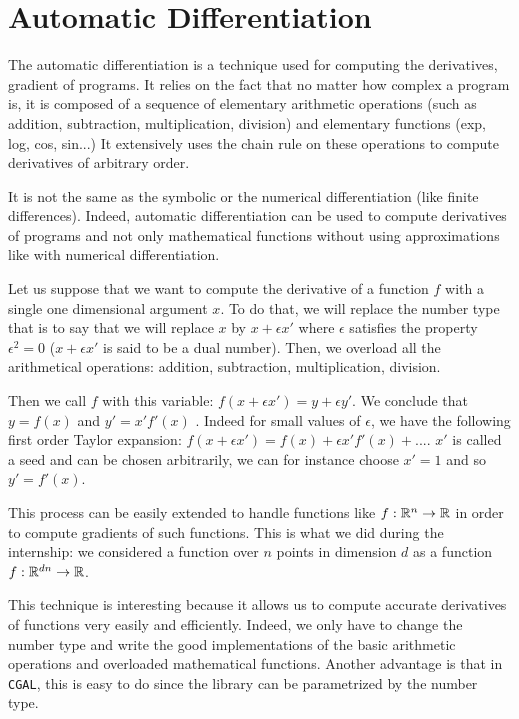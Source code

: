 \chapter{Automatic Differentiation}
\label{appendix:ad}

The automatic differentiation is a technique used for computing the derivatives,
gradient of programs. It relies on the fact that no matter how complex a program
is, it is composed of a sequence of elementary arithmetic operations (such as
addition, subtraction, multiplication, division) and elementary functions (exp,
log, cos, sin...) It extensively uses the chain rule on these operations to
compute derivatives of arbitrary order.

It is not the same as the symbolic or the numerical differentiation (like finite
differences). Indeed, automatic differentiation can be used to compute
derivatives of programs and not only mathematical functions without using
approximations like with numerical differentiation.

Let us suppose that we want to compute the derivative of a function $ f $ with a
single one dimensional argument $ x $. To do that, we will replace the number
type that is to say that we will replace $ x $ by $ x + \epsilon x' $ where $
\epsilon $ satisfies the property $ \epsilon^2 = 0 $ ($ x + \epsilon x' $ is
said to be a dual number). Then, we overload all the arithmetical operations:
addition, subtraction, multiplication, division.

Then we call $ f $ with this variable: $ f(x + \epsilon x') = y + \epsilon y' $.
We conclude that $ y = f(x) $ and $ y' = x' f'(x) $ . Indeed for small values of
$ \epsilon $, we have the following first order Taylor expansion: $ f(x +
\epsilon x') = f(x) + \epsilon x' f'(x) + ... $. $ x' $ is called a seed and can
be chosen arbitrarily, we can for instance choose $ x ' = 1 $ and so $ y' =
f'(x) $.

This process can be easily extended to handle functions like $ f : \mathbb{R}^n
\rightarrow \mathbb{R} $ in order to compute gradients of such functions. This is what
we did during the internship: we considered a function over $ n $ points in
dimension $ d $ as a function $ f : \mathbb{R}^{dn} \rightarrow \mathbb{R} $.

This technique is interesting because it allows us to compute accurate
derivatives of functions very easily and efficiently. Indeed, we only have to
change the number type and write the good implementations of the basic
arithmetic operations and overloaded mathematical functions.  Another advantage
is that in \texttt{CGAL}, this is easy to do since the library can be
parametrized by the number type.


